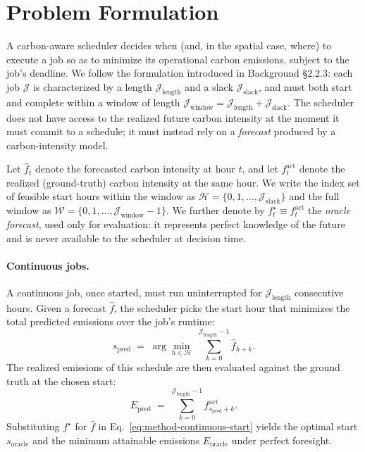 

\section{Problem Formulation}
\label{sec:method-formulation}

A carbon-aware scheduler decides when (and, in the spatial case, where) to execute a job so as to minimize its operational carbon emissions, subject to the job's deadline.
We follow the formulation introduced in Background \S2.2.3: each job $\mathcal{J}$ is characterized by a length $\mathcal{J}_{\text{length}}$ and a slack $\mathcal{J}_{\text{slack}}$, and must both start and complete within a window of length $\mathcal{J}_{\text{window}} = \mathcal{J}_{\text{length}} + \mathcal{J}_{\text{slack}}$.
The scheduler does not have access to the realized future carbon intensity at the moment it must commit to a schedule; it must instead rely on a \textit{forecast} produced by a carbon-intensity model.

Let $\hat{f}_t$ denote the forecasted carbon intensity at hour $t$, and let $f^{\text{act}}_t$ denote the realized (ground-truth) carbon intensity at the same hour.
We write the index set of feasible start hours within the window as $\mathcal{H} = \{0, 1, \ldots, \mathcal{J}_{\text{slack}}\}$ and the full window as $\mathcal{W} = \{0, 1, \ldots, \mathcal{J}_{\text{window}}-1\}$.
We further denote by $f^{\star}_t \equiv f^{\text{act}}_t$ the \textit{oracle forecast}, used only for evaluation: it represents perfect knowledge of the future and is never available to the scheduler at decision time.

\paragraph{Continuous jobs.}
A continuous job, once started, must run uninterrupted for $\mathcal{J}_{\text{length}}$ consecutive hours.
Given a forecast $\hat{f}$, the scheduler picks the start hour that minimizes the total predicted emissions over the job's runtime:
\begin{equation}
    s_{\text{pred}} \;=\; \arg\min_{h \in \mathcal{H}} \; \sum_{k=0}^{\mathcal{J}_{\text{length}}-1} \hat{f}_{h+k}.
    \label{eq:method-continuous-start}
\end{equation}
The realized emissions of this schedule are then evaluated against the ground truth at the chosen start:
\begin{equation}
    E_{\text{pred}} \;=\; \sum_{k=0}^{\mathcal{J}_{\text{length}}-1} f^{\text{act}}_{s_{\text{pred}}+k}.
    \label{eq:method-continuous-emissions}
\end{equation}
Substituting $f^{\star}$ for $\hat{f}$ in Eq.~\ref{eq:method-continuous-start} yields the optimal start $s_{\text{oracle}}$ and the minimum attainable emissions $E_{\text{oracle}}$ under perfect foresight.

